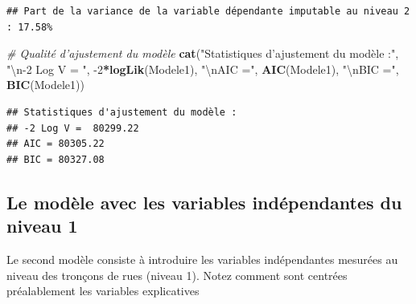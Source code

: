 \documentclass[
  11pt,
  french,
]{book}
\makeatletter
\newenvironment{Shaded}{\begin{snugshade}}{\end{snugshade}}
\newcommand{\CharTok}[1]{\textcolor[rgb]{0.31,0.60,0.02}{#1}}
\newcommand{\CommentTok}[1]{\textcolor[rgb]{0.56,0.35,0.01}{\textit{#1}}}
\newcommand{\DecValTok}[1]{\textcolor[rgb]{0.00,0.00,0.81}{#1}}
\newcommand{\KeywordTok}[1]{\textcolor[rgb]{0.13,0.29,0.53}{\textbf{#1}}}
\newcommand{\NormalTok}[1]{#1}
\newcommand{\OperatorTok}[1]{\textcolor[rgb]{0.81,0.36,0.00}{\textbf{#1}}}
\newcommand{\StringTok}[1]{\textcolor[rgb]{0.31,0.60,0.02}{#1}}
\newenvironment{kframe}{%
\medskip{}
\setlength{\fboxsep}{.8em}
 \def\at@end@of@kframe{}%
 \ifinner\ifhmode%
  \def\at@end@of@kframe{\end{minipage}}%
  \begin{minipage}{\columnwidth}%
 \fi\fi%
 \def\FrameCommand##1{\hskip\@totalleftmargin \hskip-\fboxsep
 \colorbox{shadecolor}{##1}\hskip-\fboxsep
     \hskip-\linewidth \hskip-\@totalleftmargin \hskip\columnwidth}%
 \MakeFramed {\advance\hsize-\width
   \@totalleftmargin\z@ \linewidth\hsize
   \@setminipage}}%
 {\par\unskip\endMakeFramed%
 \at@end@of@kframe}
\renewenvironment{Shaded}{\begin{kframe}}{\end{kframe}}
\makeatother
\begin{document}
\begin{verbatim}
## Part de la variance de la variable dépendante imputable au niveau 2 : 17.58%
\end{verbatim}

\begin{Shaded}
\begin{Highlighting}[]
\CommentTok{# Qualité d'ajustement du modèle}
\KeywordTok{cat}\NormalTok{(}\StringTok{"Statistiques d'ajustement du modèle :"}\NormalTok{,}
    \StringTok{"}\CharTok{\textbackslash{}n}\StringTok{-2 Log V = "}\NormalTok{, }\DecValTok{-2}\OperatorTok{*}\KeywordTok{logLik}\NormalTok{(Modele1),}
    \StringTok{"}\CharTok{\textbackslash{}n}\StringTok{AIC ="}\NormalTok{, }\KeywordTok{AIC}\NormalTok{(Modele1), }
    \StringTok{"}\CharTok{\textbackslash{}n}\StringTok{BIC ="}\NormalTok{, }\KeywordTok{BIC}\NormalTok{(Modele1))}
\end{Highlighting}
\end{Shaded}

\begin{verbatim}
## Statistiques d'ajustement du modèle : 
## -2 Log V =  80299.22 
## AIC = 80305.22 
## BIC = 80327.08
\end{verbatim}

\hypertarget{sect08412}{%
\subsection{Le modèle avec les variables indépendantes du niveau 1}\label{sect08412}}

Le second modèle consiste à introduire les variables indépendantes mesurées au niveau des tronçons de rues (niveau 1). Notez comment sont centrées préalablement les variables explicatives
\end{document}
